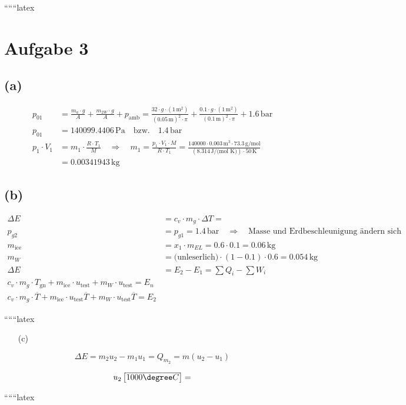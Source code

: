 
``````latex

\section*{Aufgabe 3}

\subsection*{(a)}
\begin{align*}
p_{01} &= \frac{m_a \cdot g}{A} + \frac{m_{2W} \cdot g}{A} + p_{\text{amb}} = \frac{32 \cdot g \cdot (1 \, \text{m}^2)}{(0.05 \, \text{m})^2 \cdot \pi} + \frac{0.1 \cdot g \cdot (1 \, \text{m}^2)}{(0.1 \, \text{m})^2 \cdot \pi} + 1.6 \, \text{bar} \\
p_{01} &= 140099.4406 \, \text{Pa} \quad \text{bzw.} \quad 1.4 \, \text{bar} \\
p_1 \cdot V_1 &= m_1 \cdot \frac{R \cdot T_1}{M} \quad \Rightarrow \quad m_1 = \frac{p_1 \cdot V_1 \cdot M}{R \cdot T_1} = \frac{140000 \cdot 0.003 \, \text{m}^3 \cdot 73.3 \, \text{g/mol}}{(8.314 \, \text{J/(mol K)}) \cdot 50 \, \text{K}} \\
&= 0.00341943 \, \text{kg}
\end{align*}

\subsection*{(b)}
\begin{align*}
\Delta E &= c_v \cdot m_g \cdot \Delta T = \\
p_{g2} &= p_{g1} = 1.4 \, \text{bar} \quad \Rightarrow \quad \text{Masse und Erdbeschleunigung ändern sich nicht} \\
m_{\text{ice}} &= x_1 \cdot m_{EL} = 0.6 \cdot 0.1 = 0.06 \, \text{kg} \\
m_W &= \text{(unleserlich)} \cdot (1 - 0.1) \cdot 0.6 = 0.054 \, \text{kg} \\
\Delta E &= E_2 - E_1 = \sum Q_i - \sum W_i \\
c_v \cdot m_g \cdot T_{\text{gn}} + m_{\text{ice}} \cdot u_{\text{test}} + m_W \cdot u_{\text{test}} = E_n \\
c_v \cdot m_g \cdot \overline{T} + m_{\text{ice}} \cdot u_{\text{test}} \overline{T} + m_W \cdot u_{\text{test}} \overline{T} = E_2
\end{align*}

``````latex


\begin{itemize}
    \item[(c)]
\end{itemize}

\[
\Delta E = m_2 u_2 - m_1 u_1 = Q_{m_2} = m (u_2 - u_1)
\]

\[
u_2 \left[ \overline{1000 \degree C} \right] =
\]

``````latex


